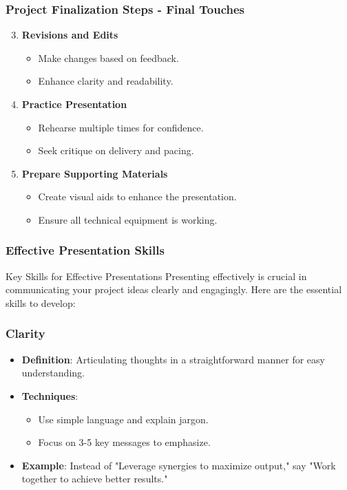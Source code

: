 \documentclass{beamer}
\begin{document}
\begin{frame}[fragile]
    \frametitle{Project Finalization Steps - Final Touches}
    \begin{enumerate}
        \setcounter{enumi}{2}
        \item \textbf{Revisions and Edits}
        \begin{itemize}
            \item Make changes based on feedback.
            \item Enhance clarity and readability.
        \end{itemize}
        
        \item \textbf{Practice Presentation}
        \begin{itemize}
            \item Rehearse multiple times for confidence.
            \item Seek critique on delivery and pacing.
        \end{itemize}

        \item \textbf{Prepare Supporting Materials}
        \begin{itemize}
            \item Create visual aids to enhance the presentation.
            \item Ensure all technical equipment is working.
        \end{itemize}
    \end{enumerate}
\end{frame}

\begin{frame}[fragile]
    \frametitle{Effective Presentation Skills}
    \begin{block}{Key Skills for Effective Presentations}
        Presenting effectively is crucial in communicating your project ideas clearly and engagingly. Here are the essential skills to develop:
    \end{block}
\end{frame}

\begin{frame}[fragile]
    \frametitle{Clarity}
    \begin{itemize}
        \item \textbf{Definition}: Articulating thoughts in a straightforward manner for easy understanding.
        \item \textbf{Techniques}:
        \begin{itemize}
            \item Use simple language and explain jargon.
            \item Focus on 3-5 key messages to emphasize.
        \end{itemize}
        \item \textbf{Example}: Instead of "Leverage synergies to maximize output," say "Work together to achieve better results."
    \end{itemize}
\end{frame}
\end{document}
